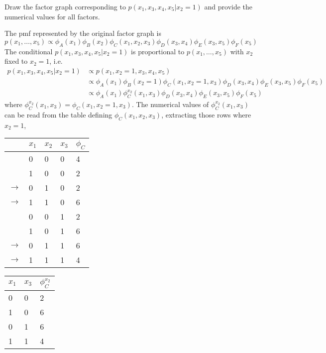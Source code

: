 \begin{exenumerate}
\item Draw the factor graph corresponding to $p(x_1, x_3, x_4, x_5 | x_2 =1)$ and provide the numerical values for all factors.
  
  \begin{solution}
    The pmf represented by the original factor graph is
    $$p(x_1, \ldots, x_5) \propto \phi_A(x_1) \phi_B(x_2) \phi_C(x_1,x_2,x_3) \phi_D(x_3,x_4) \phi_E(x_3,x_5) \phi_F(x_5)$$
    The conditional $p(x_1, x_3, x_4, x_5 | x_2 =1)$ is proportional to $p(x_1, \ldots, x_5)$ with $x_2$ fixed to $x_2=1$, i.e.\
    \begin{align}
      p(x_1, x_3, x_4, x_5 | x_2 =1) &\propto p(x_1,x_2=1, x_3, x_4, x_5) \\
      & \propto \phi_A(x_1) \phi_B(x_2=1) \phi_C(x_1,x_2=1,x_3) \phi_D(x_3,x_4) \phi_E(x_3,x_5) \phi_F(x_5)\\
      & \propto \phi_A(x_1) \phi^{x_2}_C(x_1,x_3) \phi_D(x_3,x_4) \phi_E(x_3,x_5) \phi_F(x_5)
    \end{align}
    where $\phi^{x_2}_C(x_1,x_3) = \phi_C(x_1,x_2=1,x_3)$. The numerical values of  $\phi^{x_2}_C(x_1,x_3)$ can be read from the table defining $\phi_C(x_1,x_2,x_3)$, extracting those rows where $x_2=1$,
    \begin{center}
      \begin{tabular}{lllll}
        \toprule
        & $x_1$ & $x_2$ & $x_3$ & $\phi_C$\\
      \midrule
      &0 & 0 & 0 & 4 \\
      &1 & 0 & 0 & 2 \\
      $\rightarrow$&0 & 1 & 0 & 2 \\
      $\rightarrow$& 1 & 1 & 0 & 6 \\
      &0 & 0 & 1 & 2 \\
      &1 & 0 & 1 & 6 \\
       $\rightarrow$&0 & 1 & 1 & 6 \\
       $\rightarrow$&1 & 1 & 1 & 4 \\
      \bottomrule
      \end{tabular}
      \hspace{3ex}  \hspace{3ex}
      \begin{tabular}{lll}
        \toprule
        $x_1$ & $x_3$ & $\phi^{x_2}_C$\\
      \midrule
      0 & 0 & 2 \\
      1 & 0 & 6 \\
      0 & 1 & 6 \\
      1 & 1 & 4 \\
      \bottomrule
      \end{tabular}
    \end{center}
  

\end{solution}
\end{exenumerate}
